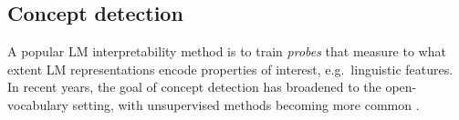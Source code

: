 \documentclass{article}
\theoremstyle{plain}
\theoremstyle{definition}
\theoremstyle{remark}
\renewcommand{\cite}{\citep}
\newcommand{\shortbenchmark}{\textsc{AxBench}}
\newcommand{\methodtag}[2]{%
  \tikz[baseline=(char.base)]{%
    \node[
      fill=#1,
      rounded corners=2pt,
      text=white,
      font=\bfseries,
      minimum width=1em,
      minimum height=1em,
      align=center,
      inner sep=0pt
    ](char){#2};%
  }%
}
\newcommand{\concepttag}{\protect\methodtag{conceptcolor}{C}}
\begin{document}

\subsection{\concepttag{} Concept detection}\label{sec:concept-detection}
A popular LM interpretability method is to train \textit{probes} \cite{conneau-etal-2018-cram, hewitt-manning-2019-structural, belinkov-etal-2017-neural} that measure to what extent LM representations encode properties of interest, e.g.~linguistic features. In recent years, the goal of concept detection has broadened to the open-vocabulary setting, with unsupervised methods becoming more common \cite{bills2023language,huben2024sparse,choi2024automatic}.

\end{document}
